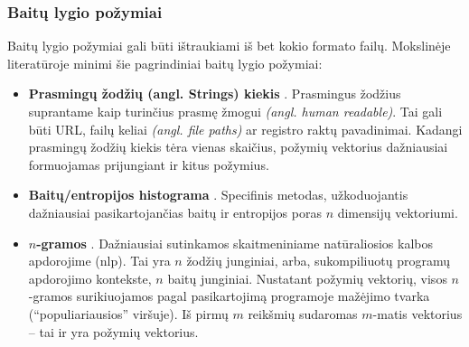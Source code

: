\subsubsection{Baitų lygio požymiai}\label{sec:literature:features:byte}
Baitų lygio požymiai gali būti ištraukiami iš bet kokio formato failų. Mokslinėje literatūroje minimi šie pagrindiniai baitų lygio požymiai:
\begin{itemize}
    \item \textbf{Prasmingų žodžių (angl. Strings) kiekis} \cite{andersonLearningEvadeStatic2018}. Prasmingus žodžius suprantame kaip turinčius prasmę žmogui \textit{(angl. human readable)}. Tai gali būti URL, failų keliai \textit{(angl. file paths)} ar registro raktų pavadinimai. Kadangi prasmingų žodžių kiekis tėra vienas skaičius, požymių vektorius dažniausiai formuojamas prijungiant ir kitus požymius.
    \item \textbf{Baitų/entropijos histograma} \cite{saxeDeepNeuralNetwork2015}. Specifinis metodas, užkoduojantis dažniausiai pasikartojančias baitų ir entropijos poras $n$ dimensijų vektoriumi.
    \item \textbf{$n$-gramos} \cite{zhuNgramMalGANEvading2022}. Dažniausiai sutinkamos skaitmeniniame natūraliosios kalbos apdorojime (\gls{nlp}). Tai yra $n$ žodžių junginiai, arba, sukompiliuotų programų apdorojimo kontekste, $n$ baitų junginiai. Nustatant požymių vektorių, visos $n$-gramos surikiuojamos pagal pasikartojimą programoje mažėjimo tvarka (\enquote{populiariausios} viršuje). Iš pirmų $m$ reikšmių sudaromas $m$-matis vektorius -- tai ir yra požymių vektorius.
\end{itemize}
